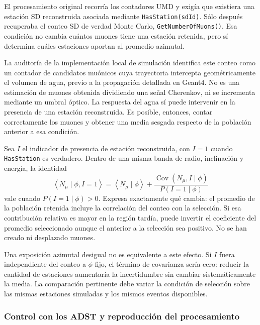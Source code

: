 El procesamiento original recorría los contadores UMD y exigía que existiera una estación SD reconstruida asociada mediante \texttt{HasStation(sdId)}. Sólo después recuperaba el conteo SD de verdad Monte Carlo, \texttt{GetNumberOfMuons()}. Esa condición no cambia cuántos muones tiene una estación retenida, pero sí determina cuáles estaciones aportan al promedio azimutal.

La auditoría de la implementación local de simulación identifica este conteo como un contador de candidatos muónicos cuya trayectoria intercepta geométricamente el volumen de agua, previo a la propagación detallada en Geant4. No es una estimación de muones obtenida dividiendo una señal Cherenkov, ni se incrementa mediante un umbral óptico. La respuesta del agua sí puede intervenir en la presencia de una estación reconstruida. Es posible, entonces, contar correctamente los muones y obtener una media sesgada respecto de la población anterior a esa condición.

Sea $I$ el indicador de presencia de estación reconstruida, con $I=1$ cuando \texttt{HasStation} es verdadero. Dentro de una misma banda de radio, inclinación y energía, la identidad
\begin{equation}
\left\langle N_\mu\mid\phi,I=1\right\rangle
=\left\langle N_\mu\mid\phi\right\rangle
+\frac{\operatorname{Cov}(N_\mu,I\mid\phi)}{P(I=1\mid\phi)}
\label{eq:infill2026_media_condicionada}
\end{equation}
vale cuando $P(I=1\mid\phi)>0$. Expresa exactamente qué cambia: el promedio de la población retenida incluye la correlación del conteo con la selección. Si esa contribución relativa es mayor en la región tardía, puede invertir el coeficiente del promedio seleccionado aunque el anterior a la selección sea positivo. No se han creado ni desplazado muones.

Una exposición azimutal desigual no es equivalente a este efecto. Si $I$ fuera independiente del conteo a $\phi$ fijo, el término de covarianza sería cero: reducir la cantidad de estaciones aumentaría la incertidumbre sin cambiar sistemáticamente la media. La comparación pertinente debe variar la condición de selección sobre las mismas estaciones simuladas y los mismos eventos disponibles.

\subsubsection{Control con los ADST y reproducción del procesamiento}

